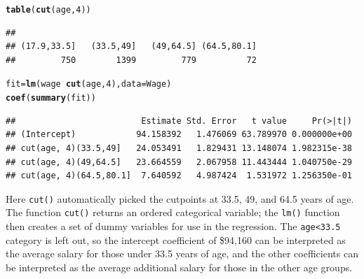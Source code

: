 \documentclass[12pt]{article}\usepackage[]{graphicx}\usepackage[]{color}
\makeatletter
\newcommand{\hlnum}[1]{\textcolor[rgb]{0.686,0.059,0.569}{#1}}%
\newcommand{\hlopt}[1]{\textcolor[rgb]{0,0,0}{#1}}%
\newcommand{\hlstd}[1]{\textcolor[rgb]{0.345,0.345,0.345}{#1}}%
\newcommand{\hlkwb}[1]{\textcolor[rgb]{0.69,0.353,0.396}{#1}}%
\newcommand{\hlkwc}[1]{\textcolor[rgb]{0.333,0.667,0.333}{#1}}%
\newcommand{\hlkwd}[1]{\textcolor[rgb]{0.737,0.353,0.396}{\textbf{#1}}}%
\newenvironment{kframe}{%
 \def\at@end@of@kframe{}%
 \ifinner\ifhmode%
  \def\at@end@of@kframe{\end{minipage}}%
  \begin{minipage}{\columnwidth}%
 \fi\fi%
 \def\FrameCommand##1{\hskip\@totalleftmargin \hskip-\fboxsep
 \colorbox{shadecolor}{##1}\hskip-\fboxsep
     \hskip-\linewidth \hskip-\@totalleftmargin \hskip\columnwidth}%
 \MakeFramed {\advance\hsize-\width
   \@totalleftmargin\z@ \linewidth\hsize
   \@setminipage}}%
 {\par\unskip\endMakeFramed%
 \at@end@of@kframe}
\newenvironment{knitrout}{}{} %
\makeatother
\begin{document}
\begin{knitrout}
\color{fgcolor}\begin{kframe}
\begin{alltt}
\hlkwd{table}\hlstd{(}\hlkwd{cut}\hlstd{(age,}\hlnum{4}\hlstd{))}
\end{alltt}
\begin{verbatim}
## 
## (17.9,33.5]   (33.5,49]   (49,64.5] (64.5,80.1] 
##         750        1399         779          72
\end{verbatim}
\begin{alltt}
\hlstd{fit}\hlkwb{=}\hlkwd{lm}\hlstd{(wage}\hlopt{~}\hlkwd{cut}\hlstd{(age,}\hlnum{4}\hlstd{),} \hlkwc{data} \hlstd{= Wage)}
\hlkwd{coef}\hlstd{(}\hlkwd{summary}\hlstd{(fit))}
\end{alltt}
\begin{verbatim}
##                         Estimate Std. Error   t value     Pr(>|t|)
## (Intercept)            94.158392   1.476069 63.789970 0.000000e+00
## cut(age, 4)(33.5,49]   24.053491   1.829431 13.148074 1.982315e-38
## cut(age, 4)(49,64.5]   23.664559   2.067958 11.443444 1.040750e-29
## cut(age, 4)(64.5,80.1]  7.640592   4.987424  1.531972 1.256350e-01
\end{verbatim}
\end{kframe}
\end{knitrout}

Here \texttt{cut()} automatically picked the cutpoints at 33.5, 49, and 64.5 years of age. The function \texttt{cut()} returns an ordered categorical variable; the \texttt{lm()} function then creates a set of dummy variables for use in the regression. The \texttt{age<33.5} category is left out, so the intercept coefficient of \$94,160 can be interpreted as the average salary for those under 33.5 years of age, and the other coefficients can be interpreted as the average additional salary for those in the other age groups.\\
\end{document}

